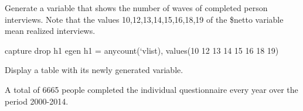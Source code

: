 \documentclass[letterpaper,10pt,openany,onesideH,english]{sphinxmanual}
\begin{document}
%
\begin{sphinxVerbatim}[commandchars=\\\{\},numbers=left,firstnumber=1,stepnumber=1]
  
    
    
\end{sphinxVerbatim}

Generate a variable that shows the number of waves of completed person interviews. Note that the values 10,12,13,14,15,16,18,19 of the \$netto variable mean realized interviews.

%
\begin{sphinxVerbatim}[commandchars=\\\{\},numbers=left,firstnumber=1,stepnumber=1]
capture drop h1
egen h1 = anycount({}`vlist\PYGZsq{}), values(10 12 13 14 15 16 18 19)
\end{sphinxVerbatim}

Display a table with its newly generated variable.

%
\begin{sphinxVerbatim}[commandchars=\\\{\},numbers=left,firstnumber=1,stepnumber=1]
     
\end{sphinxVerbatim}

\begin{figure}[H]
\centering

\noindent{}
\end{figure}

A total of 6665 people completed the individual questionnaire every year over the period 2000-2014.
\end{document}
